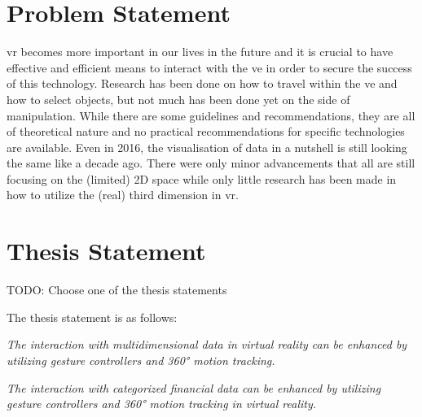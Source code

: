 
\section{Problem Statement}

\gls{vr} becomes more important in our lives in the future and it is crucial to have effective and efficient means to interact with the \gls{ve} in order to secure the success of this technology. Research has been done on how to travel within the \gls{ve} and how to select objects, but not much has been done yet on the side of manipulation. While there are some guidelines and recommendations, they are all of theoretical nature and no practical recommendations for specific technologies are available. \newline
Even in 2016, the visualisation of data in a nutshell is still looking the same like a decade ago. There were only minor advancements that all are still focusing on the (limited) 2D space while only little research has been made in how to utilize the (real) third dimension in \gls{vr}.



\section{Thesis Statement}

\newcommand{\thesisstatementtext}{tbd}

\label{TS}

TODO: Choose one of the thesis statements

The thesis statement is as follows:
\begin{framed}
	\textit{The interaction with multidimensional data in virtual reality can be enhanced by utilizing gesture controllers and 360° motion tracking.}
\end{framed}

\begin{framed}
	\textit{The interaction with categorized financial data can be enhanced by utilizing gesture controllers and 360° motion tracking in virtual reality.}
\end{framed}

